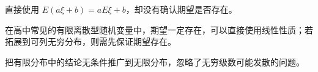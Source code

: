 \begin{trapbox}
	\medskip
	\begin{description}[style=nextline, leftmargin=2.8em, labelsep=0.5em, itemsep=0.35em]
		\item[\textbf{\textcolor{CTrap}{易错点四（误用线性性质）}}] 直接使用 $E(a\xi+b)=aE\xi+b$，却没有确认期望是否存在。
		\item[\textbf{\textcolor{CTrap}{正确理解（有限分布自动存在）：}}] 在高中常见的有限离散型随机变量中，期望一定存在，可以直接使用线性性质；若拓展到可列无穷分布，则需先保证期望存在。
		\item[\textbf{\textcolor{CTrap}{错因分析（忽略前提）：}}] 把有限分布中的结论无条件推广到无限分布，忽略了无穷级数可能发散的问题。
	\end{description}
\end{trapbox}